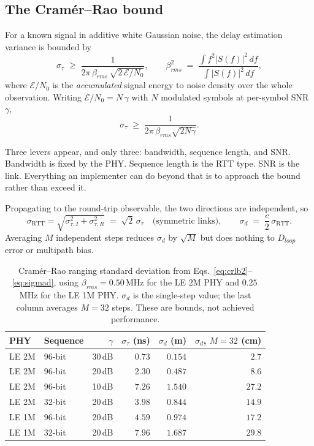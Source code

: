 \documentclass[11pt,a4paper]{article}
\newcommand{\RTT}{\mathrm{RTT}}
\begin{document}
\subsection{The Cram\'er--Rao bound}
\label{sec:crlb}

For a known signal in additive white Gaussian noise, the delay estimation variance is bounded by
\begin{equation}
\sigma_\tau \;\ge\; \frac{1}{2\pi\,\beta_{rms}\,\sqrt{2\,\mathcal{E}/N_0}},
\qquad
\beta_{rms}^2 \;=\; \frac{\displaystyle\int f^2 |S(f)|^2\,df}{\displaystyle\int |S(f)|^2\,df},
\label{eq:crlb}
\end{equation}
where $\mathcal{E}/N_0$ is the \emph{accumulated} signal energy to noise density over the whole
observation. Writing $\mathcal{E}/N_0 = N\,\gamma$ with $N$ modulated symbols at per-symbol SNR
$\gamma$,
\begin{equation}
\sigma_\tau \;\ge\; \frac{1}{2\pi\,\beta_{rms}\sqrt{2N\gamma}} .
\label{eq:crlb2}
\end{equation}

Three levers appear, and only three: bandwidth, sequence length, and SNR. Bandwidth is fixed by the
PHY. Sequence length is the RTT type. SNR is the link. Everything an implementer can do beyond that
is to approach the bound rather than exceed it.

Propagating to the round-trip observable, the two directions are independent, so
\begin{equation}
\sigma_{\RTT} = \sqrt{\sigma_{\tau,I}^2 + \sigma_{\tau,R}^2} \;=\; \sqrt{2}\,\sigma_\tau
\quad\text{(symmetric links)},
\qquad
\sigma_d \;=\; \frac{c}{2}\,\sigma_{\RTT}.
\label{eq:sigmad}
\end{equation}
Averaging $M$ independent steps reduces $\sigma_d$ by $\sqrt{M}$ but does nothing to $D_{loop}$
error or multipath bias.

\begin{table}[h]
\caption{Cram\'er--Rao ranging standard deviation from Eqs.~\eqref{eq:crlb2}--\eqref{eq:sigmad}, using
$\beta_{rms}=0.50$\,MHz for the LE 2M PHY and $0.25$\,MHz for the LE 1M PHY. $\sigma_d$ is the
single-step value; the last column averages $M=32$ steps. These are bounds, not achieved
performance.}
\label{tab:crlb}
\centering\small
\begin{tabular}{@{}llrrrr@{}}
\toprule
PHY & Sequence & $\gamma$ & $\sigma_\tau$ (ns) & $\sigma_d$ (m) & $\sigma_d$, $M{=}32$ (cm) \\
\midrule
LE 2M & 96-bit & 30\,dB & $0.73$ & $0.154$ & $2.7$ \\
LE 2M & 96-bit & 20\,dB & $2.30$ & $0.487$ & $8.6$ \\
LE 2M & 96-bit & 10\,dB & $7.26$ & $1.540$ & $27.2$ \\
LE 2M & 32-bit & 20\,dB & $3.98$ & $0.844$ & $14.9$ \\
LE 1M & 96-bit & 20\,dB & $4.59$ & $0.974$ & $17.2$ \\
LE 1M & 32-bit & 20\,dB & $7.96$ & $1.687$ & $29.8$ \\
\bottomrule
\end{tabular}
\end{table}
\end{document}
